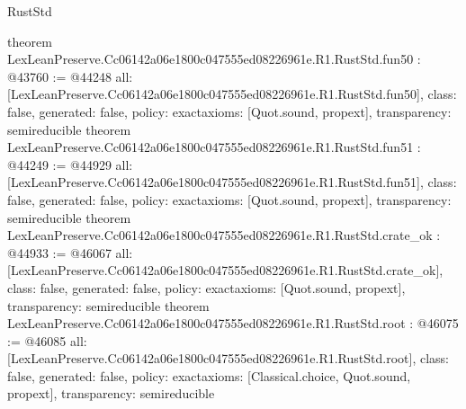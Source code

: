\begin{lexlean}{RustStd}
\begin{coremodule}
{}
theorem LexLeanPreserve.Cc06142a06e1800c047555ed08226961e.R1.RustStd.fun50 : @43760 := @44248 {
  all: [LexLeanPreserve.Cc06142a06e1800c047555ed08226961e.R1.RustStd.fun50],
  class: false,
  generated: false,
  policy: exact{axioms: [Quot.sound, propext]},
  transparency: semireducible
}
theorem LexLeanPreserve.Cc06142a06e1800c047555ed08226961e.R1.RustStd.fun51 : @44249 := @44929 {
  all: [LexLeanPreserve.Cc06142a06e1800c047555ed08226961e.R1.RustStd.fun51],
  class: false,
  generated: false,
  policy: exact{axioms: [Quot.sound, propext]},
  transparency: semireducible
}
theorem LexLeanPreserve.Cc06142a06e1800c047555ed08226961e.R1.RustStd.crate_ok : @44933 := @46067 {
  all: [LexLeanPreserve.Cc06142a06e1800c047555ed08226961e.R1.RustStd.crate_ok],
  class: false,
  generated: false,
  policy: exact{axioms: [Quot.sound, propext]},
  transparency: semireducible
}
theorem LexLeanPreserve.Cc06142a06e1800c047555ed08226961e.R1.RustStd.root : @46075 := @46085 {
  all: [LexLeanPreserve.Cc06142a06e1800c047555ed08226961e.R1.RustStd.root],
  class: false,
  generated: false,
  policy: exact{axioms: [Classical.choice, Quot.sound, propext]},
  transparency: semireducible
}


\end{coremodule}
\end{lexlean}
